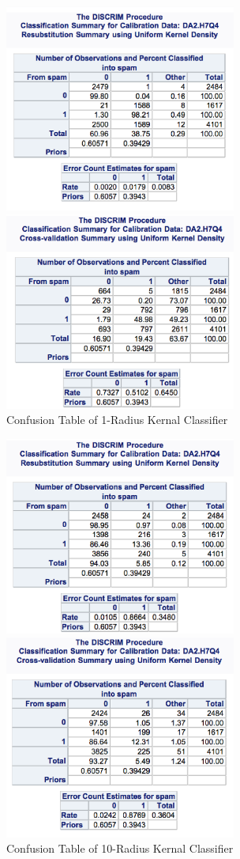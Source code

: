 \documentclass[letterpaper, 12pt]{article}
\begin{document}
\begin{figure}[htbp]
\begin{minipage}[t]{0.5\linewidth}
\centering
\includegraphics[width=3in]{7-21.eps}
\end{minipage}
\begin{minipage}[t]{0.5\linewidth}
\centering
\includegraphics[width=3in]{7-22.eps}
\end{minipage}
\caption{Confusion Table of 1-Radius Kernal Classifier}\label{t4}
\end{figure}

\begin{figure}[htbp]
\begin{minipage}[t]{0.5\linewidth}
\centering
\includegraphics[width=3in]{7-23.eps}
\end{minipage}
\begin{minipage}[t]{0.5\linewidth}
\centering
\includegraphics[width=3in]{7-24.eps}
\end{minipage}
\caption{Confusion Table of 10-Radius Kernal Classifier}\label{t5}
\end{figure}
\end{document}
